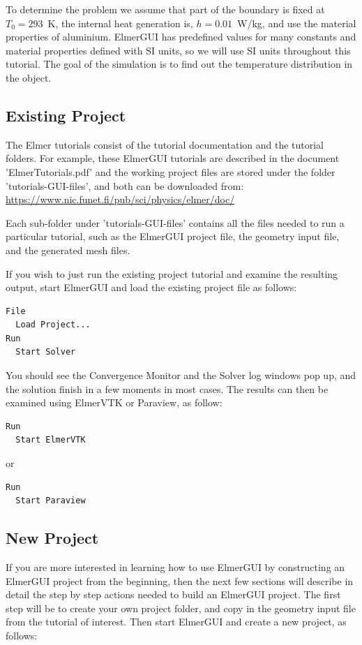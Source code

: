 To determine the problem we assume that part of the boundary is fixed at $T_0=293$~K, the internal heat generation is, $h=0.01$~W/kg, and use the material properties of aluminium.  ElmerGUI has predefined values for many constants and material properties defined with SI units, so we will use SI units throughout this tutorial.  The goal of the simulation is to find out the temperature distribution in the object.


\subsection*{Existing Project}

The Elmer tutorials consist of the tutorial documentation and the tutorial folders.  For example, these ElmerGUI tutorials are described in the document 'ElmerTutorials.pdf' and the working project files are stored under the folder 'tutorials-GUI-files', and both can be downloaded from:  \url{https://www.nic.funet.fi/pub/sci/physics/elmer/doc/}

Each sub-folder under 'tutorials-GUI-files' contains all the files needed to run a particular tutorial, such as the ElmerGUI project file, the geometry input file, and the generated mesh files.  

If you wish to just run the existing project tutorial and examine the resulting output, start ElmerGUI and load the existing project file as follows:

\begin{verbatim}
File
  Load Project...
Run
  Start Solver
\end{verbatim}

You should see the Convergence Monitor and the Solver log windows pop up, and the solution finish in a few moments in most cases.  The results can then be examined using ElmerVTK or Paraview, as follow:

\begin{verbatim}
Run
  Start ElmerVTK
\end{verbatim}
or
\begin{verbatim}
Run
  Start Paraview
\end{verbatim}

\subsection*{New Project}

If you are more interested in learning how to use ElmerGUI by constructing an ElmerGUI project from the beginning, then the next few sections will describe in detail the step by step actions needed to build an ElmerGUI project.  The first step will be to create your own project folder, and copy in the geometry input file from the tutorial of interest.  Then start ElmerGUI and create a new project, as follows:

